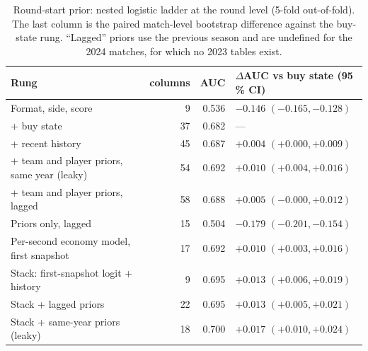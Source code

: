 \documentclass[11pt,a4paper]{article}
\begin{document}
\begin{table}[H]
\centering
\caption{Round-start prior: nested logistic ladder at the round level (5-fold out-of-fold). The last
column is the paired match-level bootstrap difference against the buy-state rung. ``Lagged'' priors use
the previous season and are undefined for the 2024 matches, for which no 2023 tables exist.}
\label{tab:prior}
\small
\begin{tabular}{lrrl}
\toprule
Rung & columns & AUC & $\Delta$AUC vs buy state (95\,\% CI) \\
\midrule
Format, side, score                             &  9 & 0.536 & $-0.146$ $(-0.165, -0.128)$ \\
+ buy state                                     & 37 & 0.682 & --- \\
+ recent history                                & 45 & 0.687 & $+0.004$ $(+0.000, +0.009)$ \\
+ team and player priors, same year (leaky)     & 54 & 0.692 & $+0.010$ $(+0.004, +0.016)$ \\
+ team and player priors, lagged                & 58 & 0.688 & $+0.005$ $(-0.000, +0.012)$ \\
Priors only, lagged                             & 15 & 0.504 & $-0.179$ $(-0.201, -0.154)$ \\
Per-second economy model, first snapshot        & 17 & 0.692 & $+0.010$ $(+0.003, +0.016)$ \\
Stack: first-snapshot logit + history           &  9 & 0.695 & $+0.013$ $(+0.006, +0.019)$ \\
Stack + lagged priors                           & 22 & 0.695 & $+0.013$ $(+0.005, +0.021)$ \\
Stack + same-year priors (leaky)                & 18 & 0.700 & $+0.017$ $(+0.010, +0.024)$ \\
\bottomrule
\end{tabular}
\end{table}
\end{document}
